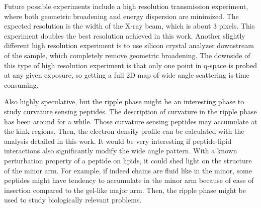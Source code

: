 Future possible experiments
include a high resolution transmission experiment, where both geometric 
broadening and energy dispersion are minimized. The expected resolution 
is the width of the X-ray beam, which is about 3 pixels. This experiment 
doubles the best resolution achieved in this work. 
Another slightly different high resolution experiment is to use silicon 
crystal analyzer downstream of the sample, which completely remove geometric
broadening. The downside of this type of high resolution experiment is that
only one point in q-space is probed at any given exposure, so getting a full
2D map of wide angle scattering is time consuming.  

Also highly speculative, but the ripple phase might be an interesting phase
to study curvature sensing peptides. The description of curvature in the
ripple phase has been around for a while. Those curvature sensing peptides
may accumulate at the kink regions. Then, the electron density profile
can be calculated with the analysis detailed in this work. It would 
be very interesting if peptide-lipid interactions also significantly 
modify the wide angle pattern. With a known perturbation property of 
a peptide on lipids, it could shed light on the structure of the minor arm.
For example, if indeed chains are fluid like in the minor, some peptides
might have tendency to accumulate in the minor arm because of ease of 
insertion compared to the gel-like major arm.
Then, the ripple phase might be used to study biologically relevant problems.
